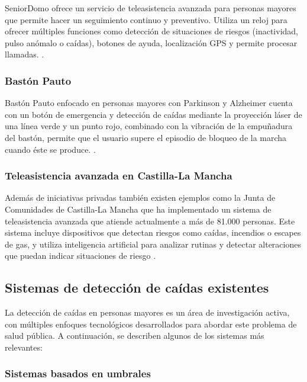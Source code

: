\documentclass[12pt, a4paper]{article}
\begin{document}
	SeniorDomo ofrece un servicio de teleasistencia avanzada para personas mayores que permite hacer un seguimiento continuo y preventivo. Utiliza un reloj para ofrecer múltiples funciones como detección de situaciones de riesgos (inactividad, pulso anómalo o caídas), botones de ayuda, localización GPS y permite procesar llamadas.  \cite{seniordomo}.
	
	\subsubsection{Bastón Pauto}
	
	Bastón Pauto enfocado en personas mayores con Parkinson y Alzheimer cuenta con un botón de emergencia y detección de caídas mediante la proyección láser de una línea verde y un punto rojo, combinado con la vibración de la empuñadura del bastón, permite que el usuario supere el episodio de bloqueo de la marcha cuando éste se produce. \cite{Pauto2019}.
	
	\subsubsection{Teleasistencia avanzada en Castilla-La Mancha}
	
	Además de iniciativas privadas también existen ejemplos como la Junta de Comunidades de Castilla-La Mancha que ha implementado un sistema de teleasistencia avanzada que atiende actualmente a más de 81.000 personas. Este sistema incluye dispositivos que detectan riesgos como caídas, incendios o escapes de gas, y utiliza inteligencia artificial para analizar rutinas y detectar alteraciones que puedan indicar situaciones de riesgo \cite{castillalamancha2025}.
	


	\subsection{Sistemas de detección de caídas existentes}


	La detección de caídas en personas mayores es un área de investigación activa, con múltiples enfoques tecnológicos desarrollados para abordar este problema de salud pública. A continuación, se describen algunos de los sistemas más relevantes:
		
	\subsubsection{Sistemas basados en umbrales}
\end{document}

